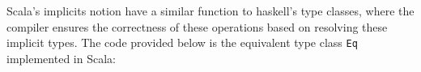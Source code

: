 
Scala’s implicits notion have a similar function to haskell's type classes, where the compiler ensures the correctness of these operations based on resolving these implicit types. The code provided below is the equivalent type class \lstinline{Eq} implemented in Scala: 




\LIMPA